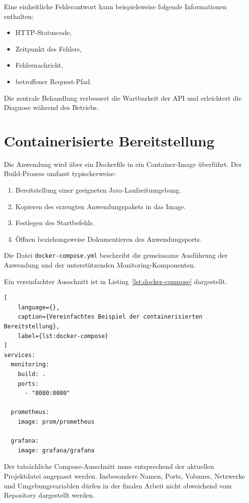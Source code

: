Eine einheitliche Fehlerantwort kann beispielsweise folgende Informationen enthalten:

\begin{itemize}
    \item HTTP-Statuscode,
    \item Zeitpunkt des Fehlers,
    \item Fehlernachricht,
    \item betroffener Request-Pfad.
\end{itemize}

Die zentrale Behandlung verbessert die Wartbarkeit der API und erleichtert die Diagnose während des Betriebs.

\section{Containerisierte Bereitstellung}
\label{sec:containerisierte-bereitstellung-implementierung}

Die Anwendung wird über ein Dockerfile in ein Container-Image überführt. Der Build-Prozess umfasst typischerweise:

\begin{enumerate}
    \item Bereitstellung einer geeigneten Java-Laufzeitumgebung.
    \item Kopieren des erzeugten Anwendungspakets in das Image.
    \item Festlegen des Startbefehls.
    \item Öffnen beziehungsweise Dokumentieren des Anwendungsports.
\end{enumerate}

Die Datei \texttt{docker-compose.yml} beschreibt die gemeinsame Ausführung der Anwendung und der unterstützenden Monitoring-Komponenten.

Ein vereinfachter Ausschnitt ist in Listing~\ref{lst:docker-compose} dargestellt.

\begin{lstlisting}[
    language={},
    caption={Vereinfachtes Beispiel der containerisierten Bereitstellung},
    label={lst:docker-compose}
]
services:
  monitoring:
    build: .
    ports:
      - "8080:8080"

  prometheus:
    image: prom/prometheus

  grafana:
    image: grafana/grafana
\end{lstlisting}

Der tatsächliche Compose-Ausschnitt muss entsprechend der aktuellen Projektdatei angepasst werden. Insbesondere Namen, Ports, Volumes, Netzwerke und Umgebungsvariablen dürfen in der finalen Arbeit nicht abweichend vom Repository dargestellt werden.

